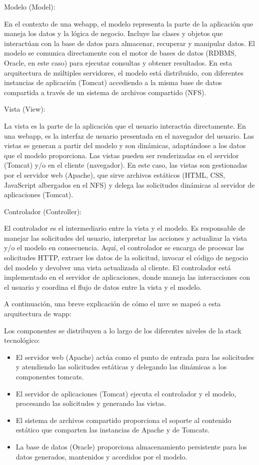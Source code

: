 Modelo (Model):

En el contexto de una webapp, el modelo representa la parte de la aplicación que maneja los datos y la lógica de negocio. Incluye las clases y objetos que interactúan con la base de datos para almacenar, recuperar y manipular datos.
El modelo se comunica directamente con el motor de bases de datos (RDBMS, Oracle, en este caso) para ejecutar consultas y obtener resultados.
En esta arquitectura de múltiples servidores, el modelo está distribuido, con diferentes instancias de aplicación (Tomcat) accediendo a la misma base de datos compartida a través de un sistema de archivos compartido (NFS).

Vista (View):

La vista es la parte de la aplicación que el usuario interactúa directamente. En una webapp, es la interfaz de usuario presentada en el navegador del usuario.
Las vistas se generan a partir del modelo y son dinámicas, adaptándose a los datos que el modelo proporciona. Las vistas pueden ser renderizadas en el servidor (Tomcat) y/o en el cliente (navegador).
En este caso, las vistas son gestionadas por el servidor web (Apache), que sirve archivos estáticos (HTML, CSS, JavaScript albergados en el NFS) y delega las solicitudes dinámicas al servidor de aplicaciones (Tomcat).

Controlador (Controller):

El controlador es el intermediario entre la vista y el modelo. Es responsable de manejar las solicitudes del usuario, interpretar las acciones y actualizar la vista y/o el modelo en consecuencia.
Aquí, el controlador se encarga de procesar las solicitudes HTTP, extraer los datos de la solicitud, invocar el código de negocio del modelo y devolver una vista actualizada al cliente.
El controlador está implementado en el servidor de aplicaciones, donde maneja las interacciones con el usuario y coordina el flujo de datos entre la vista y el modelo.

A continuación, una breve explicación de cómo el \gls{mvc} se mapeó a esta arquitectura de \Gls{wapp}:

Los componentes se distribuyen a lo largo de los diferentes niveles de la stack tecnológico:

\begin{itemize}
    \item El servidor web (Apache) actúa como el punto de entrada para las solicitudes y atendiendo las solicitudes estáticas y delegando las dinámicas a los componentes tomcats.
    \item El servidor de aplicaciones (Tomcat) ejecuta el controlador y el modelo, procesando las solicitudes y generando las vistas.
    \item El sistema de archivos compartido proporciona el soporte al contenido estático que comparten las instancias de Apache y de Tomcats.
    \item La base de datos (Oracle) proporciona almacenamiento persistente para los datos generados, mantenidos y accedidos por el modelo.
\end{itemize}

